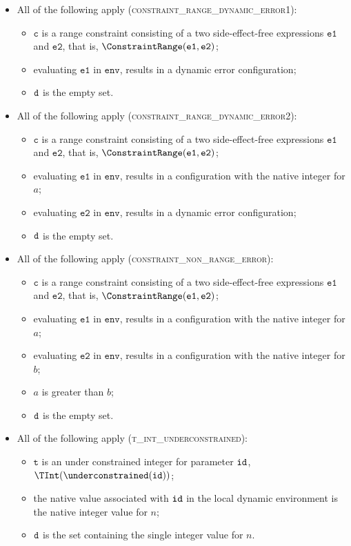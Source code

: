 \documentclass{book}
\newcommand\env[0]{\texttt{env}}
\newcommand\vc[0]{\texttt{c}}
\newcommand\vt[0]{\texttt{t}}
\newcommand\veone[0]{\texttt{e1}}
\newcommand\vetwo[0]{\texttt{e2}}
\begin{document}
\begin{itemize}
  \item All of the following apply (\textsc{constraint\_range\_dynamic\_error1}):
  \begin{itemize}
    \item $\vc$ is a range constraint consisting of a two side-effect-free expressions $\veone$ and $\vetwo$, that is, $\ConstraintRange(\veone, \vetwo)$;
    \item evaluating $\veone$ in $\env$, results in a dynamic error configuration;
    \item $\texttt{d}$ is the empty set.
  \end{itemize}

  \item All of the following apply (\textsc{constraint\_range\_dynamic\_error2}):
  \begin{itemize}
    \item $\vc$ is a range constraint consisting of a two side-effect-free expressions $\veone$ and $\vetwo$, that is, $\ConstraintRange(\veone, \vetwo)$;
    \item evaluating $\veone$ in $\env$, results in a configuration with the native integer for $a$;
    \item evaluating $\vetwo$ in $\env$, results in a dynamic error configuration;
    \item $\texttt{d}$ is the empty set.
  \end{itemize}

  \item All of the following apply (\textsc{constraint\_non\_range\_error}):
  \begin{itemize}
    \item $\vc$ is a range constraint consisting of a two side-effect-free expressions $\veone$ and $\vetwo$, that is, $\ConstraintRange(\veone, \vetwo)$;
    \item evaluating $\veone$ in $\env$, results in a configuration with the native integer for $a$;
    \item evaluating $\vetwo$ in $\env$, results in a configuration with the native integer for $b$;
    \item $a$ is greater than $b$;
    \item $\texttt{d}$ is the empty set.
  \end{itemize}

  \item All of the following apply (\textsc{t\_int\_underconstrained}):
  \begin{itemize}
    \item $\vt$ is an under constrained integer for parameter $\texttt{id}$, \\ $\TInt(\underconstrained(\id))$;
    \item the native value associated with $\texttt{id}$ in the local dynamic environment is the native integer value for $n$;
    \item $\texttt{d}$ is the set containing the single integer value for $n$.
  \end{itemize}


\end{itemize}
\end{document}
